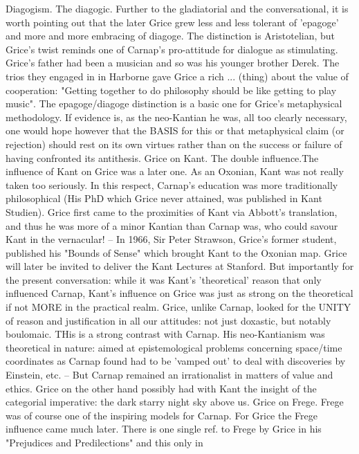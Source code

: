 \documentclass[10pt,titlepage]{book}
\begin{document}
Diagogism. The  diagogic. Further to the gladiatorial and the 
conversational, it is  worth  pointing out that the later Grice grew less and less 
tolerant of 'epagoge'   and more and more embracing of diagoge. The distinction is 
Aristotelian,  but  Grice's twist reminds one of Carnap's pro-attitude for 
dialogue  as   stimulating. Grice's  father had been a musician and so was 
his younger brother Derek.  The trios  they engaged in in Harborne gave Grice 
a rich ... (thing) about the value of  cooperation: "Getting together to do 
philosophy should be like getting  to  play music". The epagoge/diagoge 
distinction is a basic one for Grice's  metaphysical  methodology. If evidence 
is, as the neo-Kantian he was, all  too clearly  
necessary, one would hope however that the BASIS for this  or that 
metaphysical  claim (or rejection) should rest on its own virtues  rather than on 
the success  or failure of having confronted its  antithesis. 
Grice  on Kant. The  double influence.The influence of Kant on Grice was a 
later one. As an Oxonian,  Kant was not really taken too seriously. In this 
respect, Carnap's education was  more traditionally philosophical (His PhD 
which Grice never attained, was  published in Kant Studien). Grice first came 
to the proximities of Kant via  Abbott's translation, and thus he was more 
of a minor Kantian than Carnap was,  who could savour Kant in the 
vernacular! -- In 1966, Sir Peter Strawson, Grice's  former student, published his 
"Bounds of Sense" which brought Kant to the  Oxonian map. Grice will later be 
invited to deliver the Kant Lectures at  Stanford. But  importantly for the 
present conversation: while it was Kant's 'theoretical'  reason that only 
influenced Carnap, Kant's influence on Grice was just as strong  on the 
theoretical if not MORE in the practical realm. Grice, unlike  Carnap, looked for 
the UNITY of reason and justification in all  our attitudes: not just 
doxastic, but notably boulomaic. THis is a strong  contrast with Carnap. His 
neo-Kantianism was theoretical in nature: aimed at  epistemological problems 
concerning space/time coordinates as Carnap  found had to be 'vamped out' to deal 
with discoveries by Einstein, etc.  -- But Carnap remained an irrationalist 
in matters of value and  ethics. Grice on the other hand possibly had with 
Kant the insight of the  categorial imperative: the dark starry night sky 
above us. 
Grice  on Frege. Frege was of course one of the inspiring models for 
Carnap. For  Grice the Frege influence came much later. There is one single ref. 
to Frege by  Grice in his "Prejudices and Predilections" and this only in 
\end{document}
